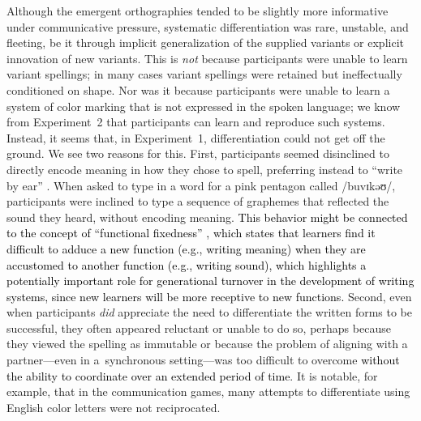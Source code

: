 \documentclass[doc,biblatex]{apa7}
\newcommand\newmaterial[1]{\textcolor{black}{#1}}
\begin{document}
Although the emergent orthographies tended to be slightly more informative under communicative pressure, systematic differentiation was rare, unstable, and fleeting, be it through implicit generalization of the supplied variants or explicit innovation of new variants. This is \textit{not} because participants were unable to learn variant spellings; in many cases variant spellings were retained but ineffectually conditioned on shape. Nor was it because participants were unable to learn a system of color marking that is not expressed in the spoken language; we know from Experiment~2 that participants can learn and reproduce such systems. Instead, it seems that, in Experiment~1, differentiation could not get off the ground. We see two reasons for this. First, participants seemed disinclined to directly encode meaning in how they chose to spell, preferring instead to ``write by ear'' \parencite{Frith:1979}. When asked to type in a word for a pink pentagon called /buvɪkəʊ/, participants were inclined to type a sequence of graphemes that reflected the sound they heard, without encoding meaning. \newmaterial{This behavior might be connected to the concept of ``functional fixedness'' \parencite{German:2000}, which states that learners find it difficult to adduce a new function (e.g., writing meaning) when they are accustomed to another function (e.g., writing sound), which highlights a potentially important role for generational turnover in the development of writing systems, since new learners will be more receptive to new functions.} Second, even when participants \textit{did} appreciate the need to differentiate the written forms to be successful, they often appeared reluctant or unable to do so, perhaps because they viewed the spelling as immutable or because the problem of aligning with a partner---even in a~synchronous setting---was too difficult to overcome \newmaterial{without the ability to coordinate over an extended period of time}. It is notable, for example, that in the communication games, many attempts to differentiate using English color letters were not reciprocated.
\end{document}
